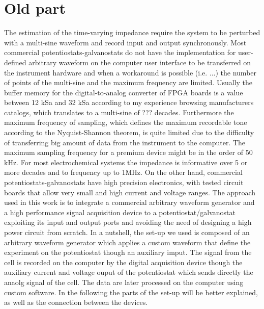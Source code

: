 \section{Old part}
The estimation of the time-varying impedance require the system to be perturbed with a multi-sine waveform and record input and output synchronously. Most commercial potentiostats-galvanostats do not have the implementation for user-defined arbitrary waveform on the computer user interface to be transferred on the instrument hardware and when a workaround is possible (i.e. ...) the number of points of the multi-sine and the maximum frequency are limited. Usually the buffer memory for the digital-to-analog converter of FPGA boards is a value between 12 kSa and 32 kSa according to my experience browsing manufacturers catalogs, which translates to a multi-sine of ??? decades. Furthermore the maximum frequency of sampling, which defines the maximum recordable tone according to the Nyquist-Shannon theorem, is quite limited due to the difficulty of transferring  big amount of data from the instrument to the computer. The maximum sampling frequency for a premium device might be in the order of 50 kHz. For most electrochemical systems the impedance is informative over 5 or more decades and to frequency up to 1MHz. On the other hand, commercial potentiostats-galvanostats have high precision electronics, with tested circuit boards that allow very small and high current and voltage ranges. The approach used in this work is to integrate a commercial arbitrary waveform generator and a high performance signal acquisition device to a potentiostat/galvanostat exploiting its input and output ports and avoiding the need of designing a high power circuit from scratch. In a nutshell, the set-up we used is composed of an arbitrary waveform generator which applies a custom waveform that define the experiment on the potentiostat though an auxiliary imput. The signal from the cell is recorded on the computer by the digital acquisition device though the auxiliary current and voltage ouput of the potentiostat which sends directly the anaolg signal of the cell. The data are later processed on the computer using custom software.
In the following the parts of the set-up will be better explained, as well as the connection between the devices.

